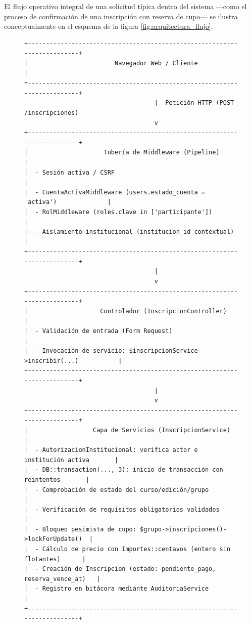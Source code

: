 El flujo operativo integral de una solicitud típica dentro del sistema —como el proceso de confirmación de una inscripción con reserva de cupo— se ilustra conceptualmente en el esquema de la figura \ref{fig:arquitectura_flujo}.

\begin{figure}[htbp]
\centering
\small
\begin{verbatim}
+-------------------------------------------------------------------------+
|                        Navegador Web / Cliente                          |
+-------------------------------------------------------------------------+
                                    |  Petición HTTP (POST /inscripciones)
                                    v
+-------------------------------------------------------------------------+
|                     Tubería de Middleware (Pipeline)                    |
|  - Sesión activa / CSRF                                                 |
|  - CuentaActivaMiddleware (users.estado_cuenta = 'activa')              |
|  - RolMiddleware (roles.clave in ['participante'])                      |
|  - Aislamiento institucional (institucion_id contextual)                 |
+-------------------------------------------------------------------------+
                                    |
                                    v
+-------------------------------------------------------------------------+
|                    Controlador (InscripcionController)                  |
|  - Validación de entrada (Form Request)                                 |
|  - Invocación de servicio: $inscripcionService->inscribir(...)           |
+-------------------------------------------------------------------------+
                                    |
                                    v
+-------------------------------------------------------------------------+
|                  Capa de Servicios (InscripcionService)                 |
|  - AutorizacionInstitucional: verifica actor e institución activa       |
|  - DB::transaction(..., 3): inicio de transacción con reintentos       |
|  - Comprobación de estado del curso/edición/grupo                       |
|  - Verificación de requisitos obligatorios validados                    |
|  - Bloqueo pesimista de cupo: $grupo->inscripciones()->lockForUpdate()  |
|  - Cálculo de precio con Importes::centavos (entero sin flotantes)      |
|  - Creación de Inscripcion (estado: pendiente_pago, reserva_vence_at)   |
|  - Registro en bitácora mediante AuditoriaService                       |
+-------------------------------------------------------------------------+

\end{verbatim}
\end{figure}
